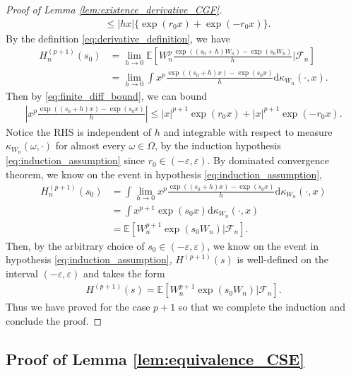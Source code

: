 \documentclass[12pt]{article}
\theoremstyle{definition}
\newcommand{\E}{\mathbb E}								%
\begin{document}
\begin{proof}[Proof of Lemma \ref{lem:existence_derivative_CGF}]
\begin{align}
		&\label{eq:finite_diff_bound}
		\leq |hx|\{\exp(r_0 x)+\exp(-r_0 x)\}.
	\end{align}
	By the definition \eqref{eq:derivative_definition}, we have
	\begin{align*}
		H^{(p+1)}_n(s_0)
		&
		=\lim_{h\rightarrow 0}\E\left[W_n^p \frac{\exp((s_0+h)W_n)-\exp(s_0W_n)}{h}|\mathcal{F}_n\right]\\
		&
		=\lim_{h\rightarrow 0}\int x^p\frac{\exp((s_0+h)x)-\exp(s_0x)}{h}\mathrm{d}\kappa_{W_n}(\cdot,x).
	\end{align*}
	Then by \eqref{eq:finite_diff_bound}, we can bound 
	\begin{align*}
		\left|x^p \frac{\exp((s_0+h)x)-\exp(s_0x)}{h}\right|\leq |x|^{p+1}\exp(r_0 x)+|x|^{p+1}\exp(-r_0 x).
	\end{align*}
	Notice the RHS is independent of $h$ and integrable with respect to measure $\kappa_{W_n}(\omega,\cdot)$ for almost every $\omega\in\Omega$, by the induction hypothesis \eqref{eq:induction_assumption} since $r_0\in(-\varepsilon,\varepsilon)$. By dominated convergence theorem, we know on the event in hypothesis \eqref{eq:induction_assumption},
	\begin{align*}
		H^{(p+1)}_n(s_0)
		&
		=\int \lim_{h\rightarrow0}x^p\frac{\exp((s_0+h)x)-\exp(s_0x)}{h}\mathrm{d}\kappa_{W_n}(\cdot,x)\\
		&
		=\int x^{p+1}\exp(s_0x)\mathrm{d}\kappa_{W_n}(\cdot,x)\\
		&
		=\E[ W_n^{p+1}\exp(s_0W_n)|\mathcal{F}_n].
	\end{align*}
	Then, by the arbitrary choice of $s_0\in (-\varepsilon,\varepsilon)$, we know on the event in hypothesis \eqref{eq:induction_assumption}, $H^{(p+1)}(s)$ is well-defined on the interval $(-\varepsilon,\varepsilon)$ and takes the form 
	\begin{align*}
		H^{(p+1)}(s)=\E[ W_n^{p+1}\exp(s_0W_n)|\mathcal{F}_n].
	\end{align*}
	Thus we have proved for the case $p+1$ so that we complete the induction and conclude the proof.
\end{proof}

\subsection{Proof of Lemma \ref{lem:equivalence_CSE}}
\end{document}
